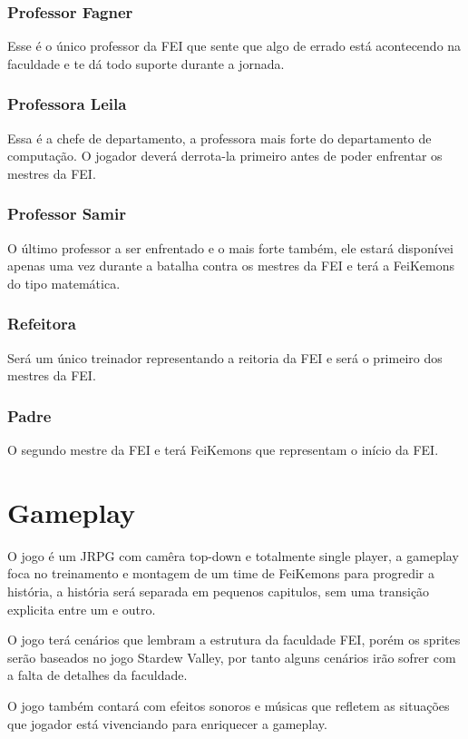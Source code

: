 \documentclass[a4paper,12pt]{article}
\begin{document}
\subsubsection{Professor Fagner}
Esse é o único professor da FEI que sente que algo de errado está acontecendo na faculdade e te dá todo suporte durante a jornada.

\subsubsection{Professora Leila}
Essa é a chefe de departamento, a professora mais forte do departamento de computação. O jogador deverá derrota-la primeiro
antes de poder enfrentar os mestres da FEI.

\subsubsection{Professor Samir}
O último professor a ser enfrentado e o mais forte também, ele estará disponívei apenas uma vez durante a batalha contra os mestres da FEI 
e terá a FeiKemons do tipo matemática.

\subsubsection{Refeitora}
Será um único treinador representando a reitoria da FEI e será o primeiro dos mestres da FEI.

\subsubsection{Padre}
O segundo mestre da FEI e terá FeiKemons que representam o início da FEI.

\newpage
\section{Gameplay}

O jogo é um JRPG com camêra top-down e totalmente single player, a gameplay foca no treinamento e montagem de um time de FeiKemons para progredir
a história, a história será separada em pequenos capitulos, sem uma transição explicita entre um e outro.

O jogo terá cenários que lembram a estrutura da faculdade FEI, porém os sprites serão baseados no jogo Stardew Valley, por tanto
alguns cenários irão sofrer com a falta de detalhes da faculdade.

O jogo também contará com efeitos sonoros e músicas que refletem as situações que jogador está vivenciando para enriquecer a gameplay.
\end{document}
